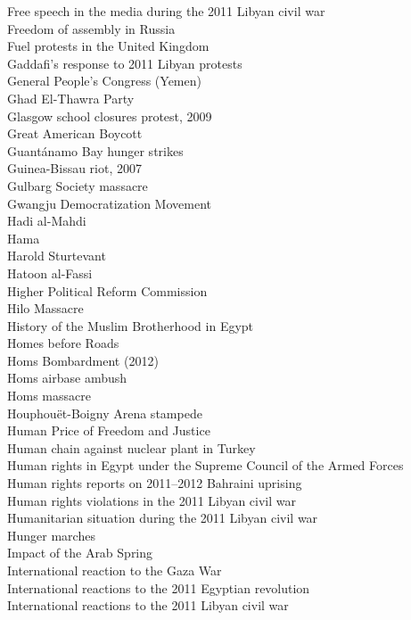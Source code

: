 Free speech in the media during the 2011 Libyan civil war\\
Freedom of assembly in Russia\\
Fuel protests in the United Kingdom\\
Gaddafi's response to 2011 Libyan protests\\
General People's Congress (Yemen)\\
Ghad El-Thawra Party\\
Glasgow school closures protest, 2009\\
Great American Boycott\\
Guantánamo Bay hunger strikes\\
Guinea-Bissau riot, 2007\\
Gulbarg Society massacre\\
Gwangju Democratization Movement\\
Hadi al-Mahdi\\
Hama\\
Harold Sturtevant\\
Hatoon al-Fassi\\
Higher Political Reform Commission\\
Hilo Massacre\\
History of the Muslim Brotherhood in Egypt\\
Homes before Roads\\
Homs Bombardment (2012)\\
Homs airbase ambush\\
Homs massacre\\
Houphouët-Boigny Arena stampede\\
Human Price of Freedom and Justice\\
Human chain against nuclear plant in Turkey\\
Human rights in Egypt under the Supreme Council of the Armed Forces\\
Human rights reports on 2011–2012 Bahraini uprising\\
Human rights violations in the 2011 Libyan civil war\\
Humanitarian situation during the 2011 Libyan civil war\\
Hunger marches\\
Impact of the Arab Spring\\
International reaction to the Gaza War\\
International reactions to the 2011 Egyptian revolution\\
International reactions to the 2011 Libyan civil war\\
